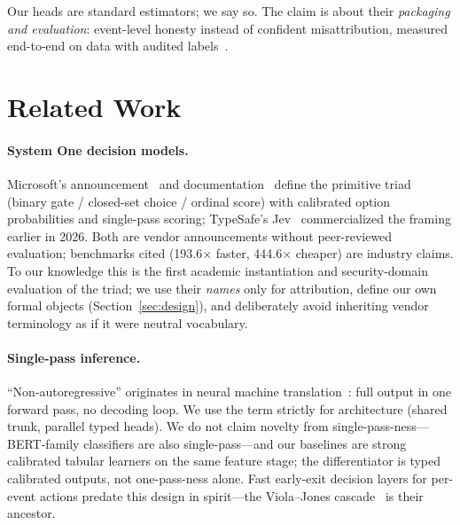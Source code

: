 \documentclass[sigconf,anonymous=false]{acmart}
\begin{document}
Our heads are standard estimators; we say so. The claim is about their \emph{packaging and evaluation}: event-level honesty instead of confident misattribution, measured end-to-end on data with audited labels~\cite{engelen2021,lanvin2022errors}.

\section{Related Work}
\label{sec:related}

\paragraph{System One decision models.} Microsoft's announcement~\cite{msdecision1} and documentation~\cite{mslearn-decision1} define the primitive triad (binary gate / closed-set choice / ordinal score) with calibrated option probabilities and single-pass scoring; TypeSafe's Jev~\cite{jevdocs,typesafejev} commercialized the framing earlier in 2026. Both are vendor announcements without peer-reviewed evaluation; benchmarks cited (193.6$\times$ faster, 444.6$\times$ cheaper) are industry claims. To our knowledge this is the first academic instantiation and security-domain evaluation of the triad; we use their \emph{names} only for attribution, define our own formal objects (Section~\ref{sec:design}), and deliberately avoid inheriting vendor terminology as if it were neutral vocabulary.

\paragraph{Single-pass inference.} ``Non-autoregressive'' originates in neural machine translation~\cite{gu2018nat}: full output in one forward pass, no decoding loop. We use the term strictly for architecture (shared trunk, parallel typed heads). We do not claim novelty from single-pass-ness---BERT-family classifiers are also single-pass---and our baselines are strong calibrated tabular learners on the same feature stage; the differentiator is typed calibrated outputs, not one-pass-ness alone. Fast early-exit decision layers for per-event actions predate this design in spirit---the Viola--Jones cascade~\cite{violajones2001} is their ancestor.
\end{document}
